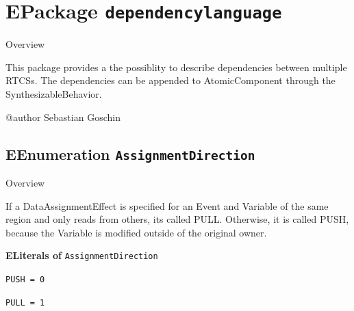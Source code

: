 
		\newcommand{\todoo}[1]{\todo[inline, color=red!40]{ecore2latex: #1}}
		
		\section{EPackage \bfseries \texttt{dependencylanguage}\normalfont}
		
		\begin{longdescription}
		\item[Overview]			
				

	

		This package provides a the possiblity to describe dependencies between multiple RTCSs.
The dependencies can be appended to AtomicComponent through the SynthesizableBehavior.

@author Sebastian Goschin		
		\end{longdescription}
	

\subsection{EEnumeration \bfseries \texttt{AssignmentDirection}\normalfont}
\label{cls:dependencylanguage::AssignmentDirection} 

	\begin{longdescription}
		\item[Overview] 		
				

	

		If a DataAssignmentEffect is specified for an Event and Variable of the same region and only reads from others, its called PULL.
Otherwise, it is called PUSH, because the Variable is modified outside of the original owner.		
	
		\item[\textbf{ELiterals of} \texttt{AssignmentDirection}] ~
		\begin{longdescription}
			
\item[\texttt{PUSH = 0}] ~
\nopagebreak

\item[\texttt{PULL = 1}] ~
\nopagebreak
		\end{longdescription}
	\end{longdescription}
	
